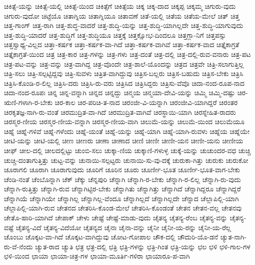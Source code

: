 {ಚಿಕಿತ್ಸೆ-ಯನ್ನು
ಚಿಕಿತ್ಸೆ-ಯಲ್ಲಿ
ಚಿಕಿತ್ಸೆ-ಯಿಂದ
ಚಿಕಿತ್ಸೆಗೆ
ಚಿಕಿತ್ಸೆಯ
ಚಿಕ್ಕ
ಚಿಕ್ಕ-ದಾದ
ಚಿಕ್ಕಪ್ಪ
ಚಿಕ್ಕಮ್ಮ
ಚಿಗುರು-ವುದು
ಚಿಗುರು-ವುದೋ
ಚಿಟ್ಟೆಯೊ
ಚಿತಾಗ್ನಿಯ
ಚಿತಾಗ್ನಿಯೂ
ಚಿತಾವಣೆ
ಚಿತೆ-ಯಲ್ಲಿ
ಚಿತೆಯ
ಚಿತೆಯ-ಮೇಲೆ
ಚಿತ್
ಚಿತ್ತ
ಚಿತ್ತ-ಗಾಂಗ್
ಚಿತ್ತ-ರಾಗಿ
ಚಿತ್ತ-ಶುದ್ಧ-ವಾದರೆ
ಚಿತ್ತ-ಶುದ್ಧಿ-ಯನ್ನು
ಚಿತ್ತ-ಶುದ್ಧಿ-ಯಾಗಿಲ್ಲದೇ
ಚಿತ್ತ-ಶುದ್ಧಿ-ಯಾಗುವುದು
ಚಿತ್ತ-ಶುದ್ಧಿ-ಯಾದರೆ
ಚಿತ್ತ-ಶುದ್ಧಿಗೆ
ಚಿತ್ತ-ಶುದ್ಧಿಯೂ
ಚಿತ್ತಕ್ಕೆ
ಚಿತ್ತಕ್ಷೋಭ-ದಿಂದಲೂ
ಚಿತ್ತಗ್ಲಾ-ನಿಗೆ
ಚಿತ್ತಪಸ್ಸು
ಚಿತ್ತಸ್ವಾಥ್ಯ-ವಿಲ್ಲದ
ಚಿತ್ತಾ-ಕರ್ಷಕ
ಚಿತ್ತಾ-ಕರ್ಷಕ-ವಾ-ಗಿದೆ
ಚಿತ್ತಾ-ಕರ್ಷಕ-ವಾಗಿವೆ
ಚಿತ್ತಾ-ಕರ್ಷಕ-ವಾದ
ಚಿತ್ತೈಕಾಗ್ರತೆ
ಚಿತ್ತೈಕಾಗ್ರತೆ-ಯಿಂದ
ಚಿತ್ರ
ಚಿತ್ರ-ಕಾರ
ಚಿತ್ರ-ಗಳನ್ನು
ಚಿತ್ರ-ಗಳು
ಚಿತ್ರ-ದಂತೆ
ಚಿತ್ರ-ದಲ್ಲಿ
ಚಿತ್ರ-ದಲ್ಲಿ-ರುವ-ವನಾರು
ಚಿತ್ರ-ಪಟ
ಚಿತ್ರ-ಪಟ-ವನ್ನು
ಚಿತ್ರ-ವನ್ನು
ಚಿತ್ರ-ವಾಗಿದ್ದ
ಚಿತ್ರ-ವೊಂದೇ
ಚಿತ್ರ-ಶಾಲೆ-ಯೊಂದನ್ನು
ಚಿತ್ರದ
ಚಿತ್ರವೇ
ಚಿತ್ರಿ-ಸಲಾಗುತ್ತಿಲ್ಲ
ಚಿತ್ರಿ-ಸಲು
ಚಿತ್ರಿ-ಸಲ್ಪಟ್ಟಿದ್ದವು
ಚಿತ್ರಿ-ಸುವಳು
ಚಿತ್ರಿತ-ವಾಗಿದ್ದುವು
ಚಿತ್ರಿಸ-ಬಲ್ಲರು
ಚಿತ್ರಿಸ-ಬಹುದು
ಚಿತ್ರಿಸ-ಬೇಕು
ಚಿತ್ರಿಸಿ
ಚಿತ್ರಿಸಿ-ಕೊಂಡಿ-ರ-ಲಿಲ್ಲ
ಚಿತ್ರಿಸಿ-ದರು
ಚಿತ್ರಿಸಿ-ರು-ವರು
ಚಿತ್ರಿಸಿದ
ಚಿತ್ರಿಸಿದ್ದರು
ಚಿತ್ರಿಸು-ವೆವೊ
ಚಿದಾ-ನಂದ-ರೂಪ-ನಾದ
ಚಿದಾ-ನಂದ-ರೂಪಃ
ಚಿನ್ನ
ಚಿನ್ನ-ವನ್ನಾಗಿ
ಚಿನ್ನದ
ಚಿನ್ನದ್ದು
ಚಿನ್ಮಯ
ಚಿನ್ಮಯಾ-ದೇವಿ-ಯನ್ನು
ಚಿಮ್ಮಿ
ಚಿಮ್ಮಿ-ದಷ್ಟು
ಚಿರ-ಋಣಿ-ಗಳಾಗಿ-ರ-ಬೇಕು
ಚಿರ-ಕಾಲ
ಚಿರ-ಪರಿಚಿ-ತ-ನಾದ
ಚಿರಂಜೀ-ವಿ-ಯನ್ನಾಗಿ
ಚಿರಂಜೀವಿ-ಯಾಗಿದ್ದರೆ
ಚಿರಂತರ
ಚಿರಕೃತಜ್ಞ-ನಾಗಿ-ರು-ವಂತೆ
ಚಿರಮುದ್ರಿತ-ವಾ-ಗಿದೆ
ಚಿರಮುದ್ರಿತ-ವಾಗಿವೆ
ಚಿರಸ್ಥಾಯಿ-ಯಾಗಿ
ಚಿರಸ್ನೇಹಿತ-ರಾದರು
ಚಿರಸ್ಮರ-ಣೀಯ
ಚಿರಸ್ಮರ-ಣೀಯ-ವನ್ನಾಗಿ
ಚಿರಸ್ಮರ-ಣೀಯ-ವಾಗಿ
ಚಿಲುಮೆ-ಯನ್ನು
ಚಿಲುಮೆ-ಯಿಂದ
ಚಿಲುಮೆಯೂ
ಚಿಹ್ನೆ
ಚಿಹ್ನೆ-ಗಳಿವೆ
ಚಿಹ್ನೆ-ಗಳೆಂದು
ಚಿಹ್ನೆ-ಯಂತೆ
ಚಿಹ್ನೆ-ಯನ್ನು
ಚಿಹ್ನೆ-ಯಾಗಿ
ಚಿಹ್ನೆ-ಯಾಗಿ-ರುವಳು
ಚಿಹ್ನೆಯ
ಚಿಹ್ನೆಯೇ
ಚೀಟಿ-ಯನ್ನು
ಚೀಟಿ-ಯಲ್ಲಿ
ಚೀಣ
ಚೀಣರು
ಚೀಣಾ
ಚೀಣಾದ
ಚೀಣಿ
ಚೀಣೀ
ಚೀಣೀ-ಯನ
ಚೀಣೀ-ಯನು
ಚೀಣೀಯ
ಚೀಫ್
ಚೀಲ-ದಲ್ಲಿ
ಚೀಲದಲ್ಲಿಟ್ಟು
ಚುಂಬಿ-ಸಲು
ಚುಕ್ಕಾ-ಣಿಯ
ಚುಕ್ಕಾಣಿ-ಗಳುಳ್ಳ
ಚುಕ್ಕೆ-ಯನ್ನು
ಚುಚುಂದರ-ವಧ
ಚುಚ್ಚಿ
ಚುಚ್ಚಿ-ದಂತಾಗುತ್ತಿತ್ತು
ಚುಟ್ಟ-ವನ್ನು
ಚುನಾಯಿ-ಸಲ್ಪಟ್ಟರು
ಚುನಾಯಿ-ಸು-ವು-ದಕ್ಕೆ
ಚುರುಕಾ-ಗಿತ್ತು
ಚುರುಕು
ಚುರುಕೋ
ಚೂರಾಗಲಿ
ಚೂರಾಗಿ
ಚೂರಾಗುವುದು
ಚೂರಿಗೆ
ಚೂರಿನ
ಚೂರು
ಚೂರ್ಣೀ-ಭೂತ
ಚೂರ್ಣೀ-ಭೂತ-ವಾಗ-ಬೇಕು
ಚೆಂಡಿ-ನಂತೆ
ಚೆಂಬೊನ್ನಾಗಿ
ಚೆಕ್
ಚೆಕ್ಕು
ಚೆನ್ನಪುರಿ
ಚೆನ್ನಾಗಿ
ಚೆನ್ನಾಗಿ-ರ-ಬೇಕು
ಚೆನ್ನಾಗಿ-ರ-ಲಿಲ್ಲ
ಚೆನ್ನಾಗಿ-ರು-ವುದು
ಚೆನ್ನಾಗಿ-ರುತ್ತಿತ್ತು
ಚೆನ್ನಾಗಿ-ರುವ
ಚೆನ್ನಾಗಿಟ್ಟಿರ-ಬೇಕು
ಚೆನ್ನಾಗಿತು
ಚೆನ್ನಾಗಿತ್ತು
ಚೆನ್ನಾಗಿದೆ
ಚೆನ್ನಾಗಿದ್ದರೂ
ಚೆನ್ನಾಗಿದ್ದರೆ
ಚೆನ್ನಾಗಿಯೆ
ಚೆನ್ನಾಗಿಯೇ
ಚೆನ್ನಾಗಿಲ್ಲ
ಚೆನ್ನಾಗಿಲ್ಲ-ವೆಂದೂ
ಚೆನ್ನಾಗಿಲ್ಲದೆ
ಚೆನ್ನಾಗಿಲ್ಲದೇ
ಚೆನ್ನಾದ
ಚೆಲ್ಲಾಪಿಲ್ಲಿ-ಯಾಗಿ
ಚೆಲ್ಲಾಪಿಲ್ಲಿ-ಯಾಗಿ-ರುವ
ಚೇತನದ
ಚೇತರಿಸಿ-ಕೊಂಡ-ಮೇಲೆ
ಚೇತರಿಸಿ-ಕೊಂಡಂತೆ
ಚೇತನ
ಚೇತನ-ವಲ್ಲ
ಚೇತನವು
ಚೇತೊ-ಹಾರಿ-ಯಾಗಿದೆ
ಚೇಪಾಕ್
ಚೇಳು
ಚೇಷ್ಟೆ
ಚೇಷ್ಟೆ-ಮಾಡು-ವುದು
ಚೈತನ್ಯ
ಚೈತನ್ಯ-ರೆಂಬ
ಚೈತನ್ಯ-ವನ್ನು
ಚೈತನ್ಯ-ವಷ್ಟೆ
ಚೈತನ್ಯ-ವಿದೆ
ಚೈತನ್ಯ-ವಿದೆಯೋ
ಚೈತನ್ಯದ
ಚೈನಾ
ಚೈನಾ-ವನ್ನು
ಚೈನೀ
ಚೈನೀ-ಯ-ರನ್ನು
ಚೈನೀ-ಯ-ರೆಲ್ಲ
ಚೊಂಬು
ಚೊಕ್ಕಟ-ವಾ-ಗಿದೆ
ಚೊಕ್ಕಟ-ವಾಗಿದ್ದುವು
ಚೋಟ-ಗೋಪಾಲ
ಚೌಕ-ದಲ್ಲಿ
ಚೌದುರಿ-ಯೊ-ಡನೆ
ಚ್ಯುತ-ನಾಗಿ-ರು-ವೆ-ನೆಂದು
ಚ್ಯುತ-ರಾದ
ಚ್ಯುತಿ
ಛತ್ರ
ಛತ್ರ-ದಲ್ಲಿ
ಛತ್ರಿ
ಛತ್ರಿ-ಗಳನ್ನು
ಛತ್ರಿ-ಗಿಂತ
ಛತ್ರಿ-ಯನ್ನು
ಛಲ
ಛಳಿ
ಛಳಿ-ಗಾಲ-ಗಳ
ಛಳಿ-ಯಿಂದ
ಛಾಯಾ
ಛಾಯಾ-ಚಿತ್ರ-ಗಳ
ಛಾಯಾ-ಮೂರ್ತಿ-ಗಳಿರಾ
ಛಾಯಾರೂ-ಪ-ವಾಗಿ
}
